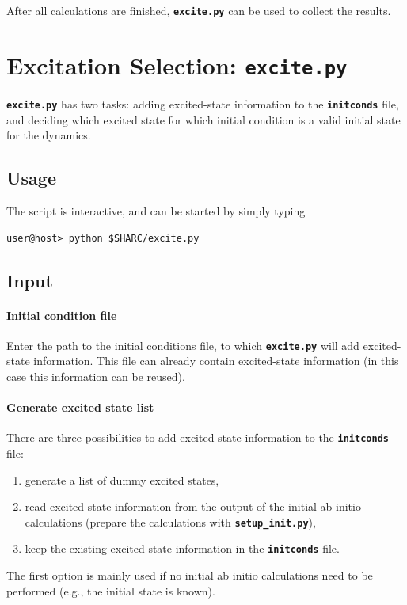 \documentclass[a4paper,10pt,DIV=15,openany,twoside=false]{scrbook}
\newcommand{\ttt}[1]{\textbf{\texttt{#1}}}
\begin{document}
After all calculations are finished, \ttt{excite.py} can be used to collect the results.





\section{Excitation Selection: \ttt{excite.py}}\label{sec:excite.py}

\ttt{excite.py} has two tasks: adding excited-state information to the \ttt{initconds} file, and deciding which excited state for which initial condition is a valid initial state for the dynamics.


\subsection{Usage}

The script is interactive, and can be started by simply typing 
\begin{verbatim}
user@host> python $SHARC/excite.py
\end{verbatim}


\subsection{Input}

\paragraph{Initial condition file}

Enter the path to the initial conditions file, to which \ttt{excite.py} will add excited-state information. This file can already contain excited-state information (in this case this information can be reused).

\paragraph{Generate excited state list}

There are three possibilities to add excited-state information to the \ttt{initconds} file:
\begin{enumerate}
  \item generate a list of dummy excited states,
  \item read excited-state information from the output of the initial ab initio calculations (prepare the calculations with \ttt{setup\_init.py}),
  \item keep the existing excited-state information in the \ttt{initconds} file.
\end{enumerate}
The first option is mainly used if no initial ab initio calculations need to be performed (e.g., the initial state is known). 
\end{document}
